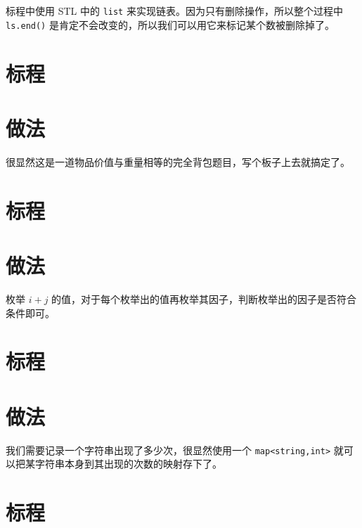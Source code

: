 \documentclass{../cpct/ctsol}
\begin{document}
标程中使用 STL 中的 \verb|list| 来实现链表。因为只有删除操作，所以整个过程中 \verb|ls.end()| 是肯定不会改变的，所以我们可以用它来标记某个数被删除掉了。

\section*{标程}

\makesolution
\section*{做法}

很显然这是一道物品价值与重量相等的完全背包题目，写个板子上去就搞定了。

\section*{标程}

\makesolution
\section*{做法}

枚举 $i+j$ 的值，对于每个枚举出的值再枚举其因子，判断枚举出的因子是否符合条件即可。

\section*{标程}

\makesolution
\section*{做法}

我们需要记录一个字符串出现了多少次，很显然使用一个 \verb|map<string,int>| 就可以把某字符串本身到其出现的次数的映射存下了。

\section*{标程}
\end{document}
